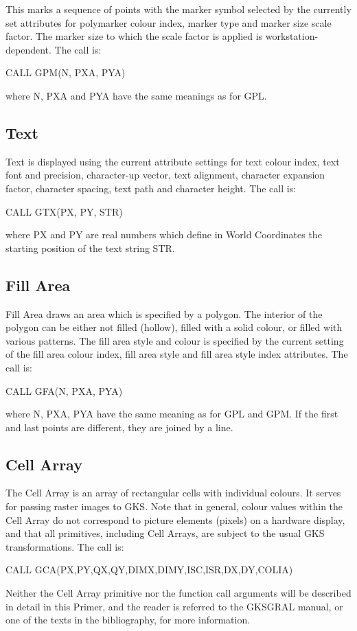 This marks a sequence of points with the marker symbol selected by the
currently set attributes for polymarker colour index, marker type and
marker size scale factor. The marker size to which the scale factor
is applied is workstation-dependent.
The call is:
\begin{XMP}
CALL GPM(N, PXA, PYA)
\end{XMP}
where N, PXA and PYA have the same meanings as for GPL.
 
\subsection{Text}
 
Text is displayed using the current attribute settings for text colour
index, text font and precision, character-up vector, text alignment,
character expansion factor, character spacing, text path and
character height. The call is:
\begin{XMP}
CALL GTX(PX, PY, STR)
\end{XMP}
where PX and PY are real numbers which define in World Coordinates the
starting position of the text string STR.
\subsection{Fill Area}
 
Fill Area draws an area which is specified by a polygon.
The interior of the polygon can be either not filled (hollow), filled
with a solid colour, or filled with various patterns.
The fill area style and colour is specified by the current setting of
the fill area colour index, fill area style and fill area style index
attributes. The call is:
\begin{XMP}
CALL GFA(N, PXA, PYA)
\end{XMP}
where N, PXA, PYA have the same meaning as for GPL and GPM.
If the first and last points are different, they are joined by a line.
\subsection{Cell Array}
 
The Cell Array is an array of rectangular cells with individual
colours. It serves for passing raster images to GKS.
Note that in general, colour values within the Cell Array do not
correspond to picture elements (pixels) on a hardware display,
and that all primitives, including Cell Arrays, are subject to
the usual GKS transformations.
The call is:
\begin{XMP}
CALL GCA(PX,PY,QX,QY,DIMX,DIMY,ISC,ISR,DX,DY,COLIA)
\end{XMP}
Neither the Cell Array primitive nor the function call arguments will be
described in detail in this Primer, and the reader is referred to the GKSGRAL
manual, or one of the texts in the bibliography, for more information.
